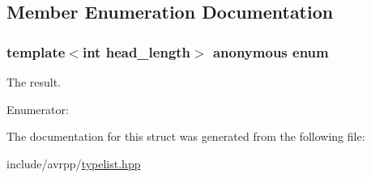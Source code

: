 \subsection{Member Enumeration Documentation}
\hypertarget{structavrpp_1_1typelist_1_1get__index_3_01null__list_00_01null__list_00_01head__length_01_4_a936be944afd362bad4c4cced06548dca}{
\subsubsection[{"@33}]{\setlength{\rightskip}{0pt plus 5cm}template$<$int head\_\-length$>$ anonymous enum}}
\label{structavrpp_1_1typelist_1_1get__index_3_01null__list_00_01null__list_00_01head__length_01_4_a936be944afd362bad4c4cced06548dca}


The result. 

\begin{Desc}
\item[Enumerator: ]\par
\begin{description}
\item[{\em 
\hypertarget{structavrpp_1_1typelist_1_1get__index_3_01null__list_00_01null__list_00_01head__length_01_4_a936be944afd362bad4c4cced06548dcaaae13e0da7aae7b42027b44c1641419f9}{
result}
\label{structavrpp_1_1typelist_1_1get__index_3_01null__list_00_01null__list_00_01head__length_01_4_a936be944afd362bad4c4cced06548dcaaae13e0da7aae7b42027b44c1641419f9}
}]\end{description}
\end{Desc}



The documentation for this struct was generated from the following file:\begin{DoxyCompactItemize}
\item 
include/avrpp/\hyperlink{typelist_8hpp}{typelist.hpp}\end{DoxyCompactItemize}
